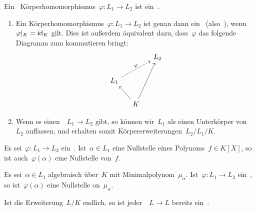 \begin{definition}
  Ein~ Körperhomomorphismus~$\varphi \colon L_1 \to L_2$ ist ein~.
\end{definition}

\begin{remark}
  \leavevmode
  \begin{enumerate}
    \item
      Ein Körperhomomorphismus~$\varphi \colon L_1 \to L_2$ ist genau dann ein~ (also~), wenn~$\restrict{\varphi}{K} = \id_K$ gilt.
      Dies ist außerdem äquivalent dazu, dass~$\varphi$ das folgende Diagramm zum kommutieren bringt:
      \[
        \begin{tikzcd}[column sep = small]
          {}
          &
          {}
          &
          L_2
          \\
          L_1
          \arrow[dashed]{urr}[above]{\varphi}
          &
          {}
          &
          {}
          \\
          {}
          &
          K
          \arrow{ul}
          \arrow{uur}
          &
          {}
        \end{tikzcd}
      \]
    \item
      Wenn es einen~~$L_1 \to L_2$ gibt, so können wir~$L_1$ als einen Unterkörper von~$L_2$ auffassen, und erhalten somit Körpererweiterungen~$L_2/L_1/K$.
  \end{enumerate}
\end{remark}

\begin{lemma}
  Es sei~$\varphi \colon L_1 \to L_2$ ein~.
  Ist~$\alpha \in L_1$ eine Nullstelle eines Polynoms~$f \in K[X]$, so ist auch~$\varphi(\alpha)$ eine Nullstelle von~$f$.
\end{lemma}

\begin{corollary}
  Es sei~$\alpha \in L_1$ algebraisch über~$K$ mit Minimalpolynom~$\mu_\alpha$.
  Ist~$\varphi \colon L_1 \to L_2$ ein~, so ist~$\varphi(\alpha)$ eine Nullstelle on~$\mu_\alpha$.
\end{corollary}

\begin{proposition}
  \label{homos are autos for finite extension}
  Ist die Erweiterung~$L/K$ endlich, so ist jeder~~$L \to L$ bereits ein~.
\end{proposition}

